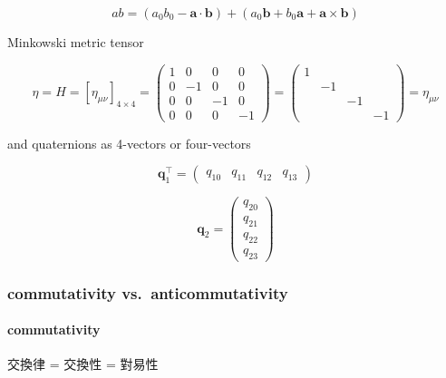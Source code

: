 \documentclass[
]{book}
\theoremstyle{definition}
\theoremstyle{definition}
\theoremstyle{definition}
\theoremstyle{definition}
\theoremstyle{remark}
\begin{document}
\[
ab=\left(a_{{\scriptscriptstyle 0}}b_{{\scriptscriptstyle 0}}-\boldsymbol{a}\cdot\boldsymbol{b}\right)+\left(a_{{\scriptscriptstyle 0}}\boldsymbol{b}+b_{{\scriptscriptstyle 0}}\boldsymbol{a}+\boldsymbol{a}\times\boldsymbol{b}\right)
\]

Minkowski metric tensor

\[
\eta=H=\left[\eta_{{\scriptscriptstyle \mu\nu}}\right]_{4\times4}=\begin{pmatrix}1 & 0 & 0 & 0\\
0 & -1 & 0 & 0\\
0 & 0 & -1 & 0\\
0 & 0 & 0 & -1
\end{pmatrix}=\begin{pmatrix}1\\
 & -1\\
 &  & -1\\
 &  &  & -1
\end{pmatrix}=\eta_{{\scriptscriptstyle \mu\nu}}
\]

and quaternions as 4-vectors or four-vectors

\[
\boldsymbol{q}_{{\scriptscriptstyle 1}}^{\intercal}=\begin{pmatrix}q_{{\scriptscriptstyle 10}} & q_{{\scriptscriptstyle 11}} & q_{{\scriptscriptstyle 12}} & q_{{\scriptscriptstyle 13}}\end{pmatrix}
\]

\[
\boldsymbol{q}_{{\scriptscriptstyle 2}}=\begin{pmatrix}q_{{\scriptscriptstyle 20}}\\
q_{{\scriptscriptstyle 21}}\\
q_{{\scriptscriptstyle 22}}\\
q_{{\scriptscriptstyle 23}}
\end{pmatrix}
\]

\hypertarget{commutativity-vs.-anticommutativity}{%
\subsubsection{commutativity vs.~anticommutativity}\label{commutativity-vs.-anticommutativity}}

\hypertarget{commutativity}{%
\paragraph{commutativity}\label{commutativity}}

\begin{CJK}{UTF8}{bsmi}
交換律 = 交換性 = 對易性
\end{CJK}
\end{document}
